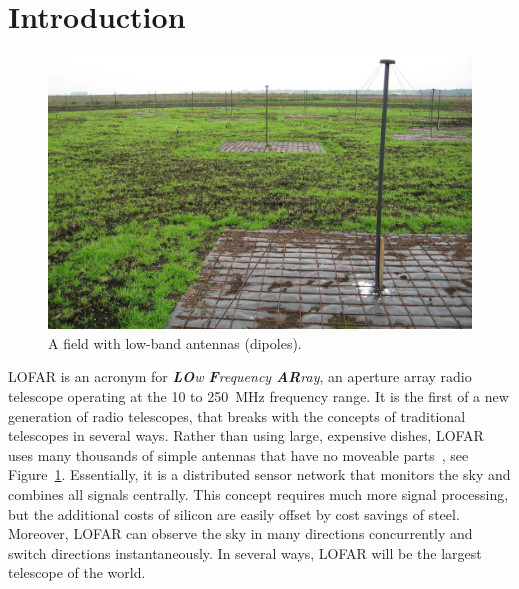 \documentclass{sig-alternate}
\begin{document}
\section{Introduction}

\begin{figure}[ht]
\begin{center}
\includegraphics[width=0.8\columnwidth]{LBA-field.jpg}
\end{center}
\caption{A field with low-band antennas (dipoles).}
\label{fig:lba-field}
\end{figure}

LOFAR is an acronym for \emph{\textbf{LO}w \textbf{F}requency \textbf{AR}ray},
an aperture array radio telescope operating at the 10 to 250~MHz frequency
range.
It is the first of a new generation of radio telescopes, that breaks with
the concepts of traditional telescopes in several ways.
Rather than using large, expensive dishes, LOFAR uses many thousands of
simple antennas that have no moveable parts~\cite{Butcher:04,deVos:09}, see Figure~\ref{fig:lba-field}.
Essentially, it is a distributed sensor network that monitors the sky
and combines all signals centrally.
This concept requires much more signal processing, but the additional costs
of silicon are easily offset by cost savings of steel.
Moreover, LOFAR can observe the sky in many directions concurrently and
switch directions instantaneously. In several ways, LOFAR will be the largest telescope of the world.
\end{document}
